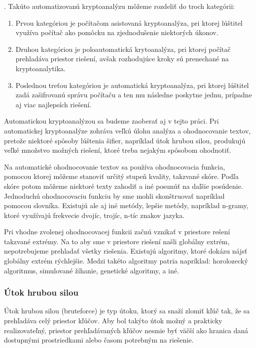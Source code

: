  \cite{ks}.
Takúto automatizovanú kryptoanalýzu môžeme rozdeliť do troch kategórii:
\begin{enumerate}
\item
Prvou kategóriou je počítačom asistovaná kryptoanalýza, pri ktorej lúštitel využíva
počítač ako pomôcku na zjednodušenie niektorých úkonov.
\item
Druhou kategóriou je poloautomatická krytoanalýza, pri ktorej počítač prehladáva priestor riešení, avšak
rozhodujúce kroky sú prenechané na kryptoanalytika.
\item
Poslednou treťou kategóriou je automatická kryptoanalýza, pri ktorej lúštitel zadá zašifrovanú správu počítaču a ten mu následne poskytne jednu, prípadne aj
viac najlepsích riešení.
\end{enumerate}
Automatickou kryptoanalýzou sa budeme zaoberať aj v tejto práci.
Pri automatickej kryptoanalýze zohráva veľkú úlohu analýza a ohodnocovanie textov, pretože niektoré spôsoby lúštenia šifier,
napríklad útok hrubou silou, produkujú veľké množstvo možných riešení, ktoré treba nejakým spôsobom ohodnotiť.

Na automatické ohodnocovanie textov sa používa ohodnocovacia funkcia, pomocou ktorej môžeme stanoviť určitý stupeň kvality, takzvané skóre.
Podľa skóre potom môžeme niektoré texty zahodiť a iné posunúť na daľšie posúdenie.
Jednoduchú ohodnocovaciu funkciu by sme mohli skonštruovať napríklad pomocou slovníka.
Existujú ale aj iné metódy, lepšie metódy, napríklad n-gramy, ktoré využívajú frekvecie dvojíc, trojíc, n-tíc znakov jazyka.

Pri vhodne zvolenej ohodnocovacej funkcii začnú vznikať v priestore rešení takzvané extrémy. Na to aby sme v priestore riešení našli globálny extrém,
nepotrebujeme prehladať všetky riešenia. Existujú algoritmy, ktoré dokázu nájsť globálny extrém rýchlejšie.
Medzi takéto algoritmy patria napríklad: horolozecký algoritmus, simulované žíhanie, genetické algoritmy, a iné.

\subsubsection{Útok hrubou silou}
Útok hrubou silou (bruteforce) je typ útoku, ktorý sa snaží zlomiť kľúč tak, že sa prehľadáva celý priestor kľúčov.
Aby bol takýto útok možný a prakticky realizovateľný, priestor prehľadávaných kľúčov nesmie byť väčší ako hranica daná dostupnými
prostriedkami alebo časom potrebným na riešenie.


